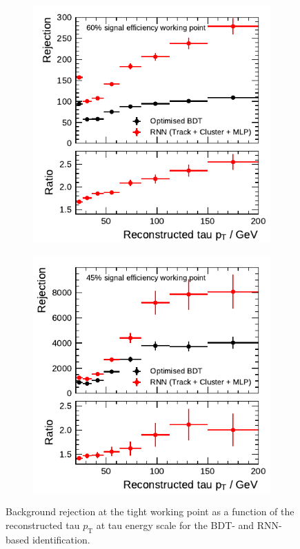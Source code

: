 \begin{figure}[htb]
  \begin{subfigure}[t]{0.48\textwidth}
    \centering
    \includegraphics{./figures/rnn/combined/rnn_tight_1p.pdf}
  \end{subfigure}\hfill
  \begin{subfigure}[t]{0.48\textwidth}
    \centering
    \includegraphics{./figures/rnn/combined/rnn_tight_3p.pdf}
  \end{subfigure}
  \caption{Background rejection at the tight working point as a function of the
    reconstructed tau $p_\text{T}$ at tau energy scale for the BDT- and
    RNN-based identification.}
  \label{fig:combined_working_points}
\end{figure}

